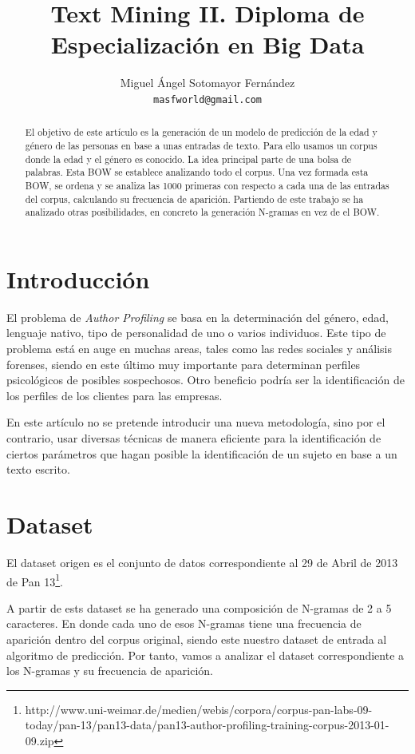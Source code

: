 \documentclass[11pt,a4paper]{article}
\title{Text Mining II. Diploma de Especialización en Big Data}
\author{Miguel Ángel Sotomayor Fernández \\
  {\tt masfworld@gmail.com} \\}
\date{}
\begin{document}
\maketitle
\begin{abstract}
  El objetivo de este artículo es la generación de un modelo de predicción de la edad y género de las personas en base a unas entradas de texto. Para ello usamos un corpus donde la edad y el género es conocido. La idea principal parte de una bolsa de palabras. Esta BOW se establece analizando todo el corpus. Una vez formada esta BOW, se ordena y se analiza las 1000 primeras con respecto a cada una de las entradas del corpus, calculando su frecuencia de aparición. Partiendo de este trabajo se ha analizado otras posibilidades, en concreto la generación N-gramas en vez de el BOW.
\end{abstract}


\section{Introducción}

El problema de \emph{Author Profiling} se basa en la determinación del género, edad, lenguaje nativo, tipo de personalidad de uno o varios individuos. Este tipo de problema está en auge en muchas areas, tales como las redes sociales y análisis forenses, siendo en este último muy importante para determinan perfiles psicológicos de posibles sospechosos. Otro beneficio podría ser la identificación de los perfiles de los clientes para las empresas.

En este artículo no se pretende introducir una nueva metodología, sino por el contrario, usar diversas técnicas de manera eficiente para la identificación de ciertos parámetros que hagan posible la identificación de un sujeto en base a un texto escrito.



\section{Dataset}

El dataset origen es el conjunto de datos correspondiente al 29 de Abril de 2013 de Pan 13\footnote{http://www.uni-weimar.de/medien/webis/corpora/corpus-pan-labs-09-today/pan-13/pan13-data/pan13-author-profiling-training-corpus-2013-01-09.zip}.

A partir de ests dataset se ha generado una composición de N-gramas de 2 a 5 caracteres. En donde cada uno de esos N-gramas tiene una frecuencia de aparición dentro del corpus original, siendo este nuestro dataset de entrada al algoritmo de predicción. Por tanto, vamos a analizar el dataset correspondiente a los N-gramas y su frecuencia de aparición.
\end{document}
